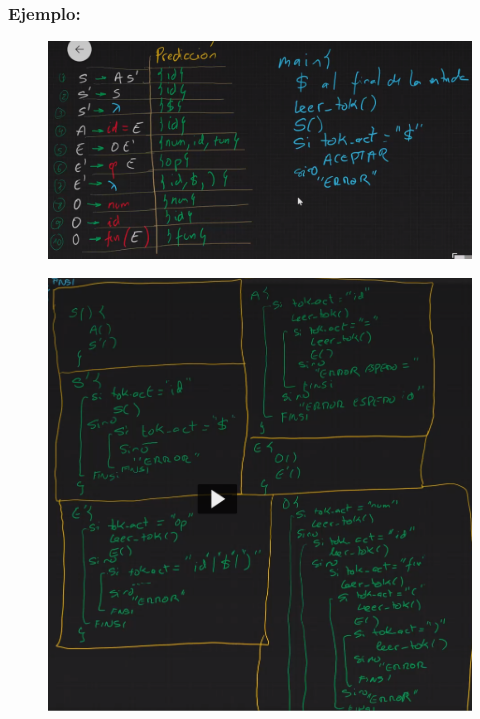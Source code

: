 \documentclass[12pt, twoside, openright]{report} %
\begin{document}
\pagebreak

\subsubsection{Ejemplo:}

\begin{figure}[H]
	{\includegraphics[scale=.4]{2021-03-26 17_49_53-Ejercicio descendente recursivo.png}}
\end{figure}

\begin{figure}[H]
	{\includegraphics[scale=.5]{Untitled 102.png}}
\end{figure}
\end{document}
